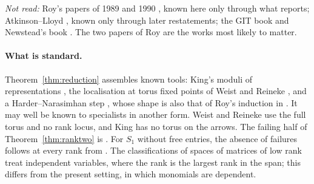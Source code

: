 \documentclass[11pt,a4paper]{article}
\theoremstyle{plain}
\theoremstyle{definition}
\begin{document}
\emph{Not read:} Roy's papers of 1989 and 1990 \cite{Roy89,Roy90}, known here only through what \cite{Wal00} reports; Atkinson--Lloyd \cite{AL80}, known only through later restatements; the GIT book \cite{MFK} and Newstead's book \cite{New}. The two papers of Roy are the works most likely to matter.

\paragraph{What is standard.} Theorem~\ref{thm:reduction} assembles known tools: King's moduli of representations \cite{Kin94}, the localisation at torus fixed points of Weist \cite{Wei13} and Reineke \cite[\S7]{Rei08}, and a Harder--Narasimhan step \cite{Rei03}, whose shape is also that of Roy's induction in \cite[Th.~5]{Roy92}. It may well be known to specialists in another form. Weist and Reineke use the full torus and no rank locus, and King has no torus on the arrows. The failing half of Theorem~\ref{thm:ranktwo} is \cite[Cor.~2]{Roy92}. For $S_{1}$ without free entries, the absence of failures follows at every rank from \cite[Th.~3.4]{Roy95}. The classifications of spaces of matrices of low rank \cite{EH88} treat independent variables, where the rank is the largest rank in the span; this differs from the present setting, in which monomials are dependent.
\end{document}

